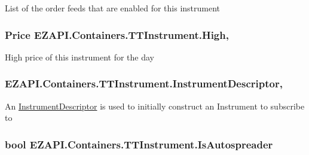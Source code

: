List of the order feeds that are enabled for this instrument 

\hypertarget{class_e_z_a_p_i_1_1_containers_1_1_t_t_instrument_aec69a584ec4a677757a51f664ccf5a7f}{
\subsubsection[{High}]{\setlength{\rightskip}{0pt plus 5cm}Price E\-Z\-A\-P\-I.\-Containers.\-T\-T\-Instrument.\-High\hspace{0.3cm}{\ttfamily [get]}, {\ttfamily [set]}}}\label{class_e_z_a_p_i_1_1_containers_1_1_t_t_instrument_aec69a584ec4a677757a51f664ccf5a7f}


High price of this instrument for the day 

\hypertarget{class_e_z_a_p_i_1_1_containers_1_1_t_t_instrument_ae2974cc8462657c2232b5bf1b886c91d}{
\subsubsection[{Instrument\-Descriptor}]{ E\-Z\-A\-P\-I.\-Containers.\-T\-T\-Instrument.\-Instrument\-Descriptor\hspace{0.3cm}{\ttfamily [get]}, {\ttfamily [set]}}}\label{class_e_z_a_p_i_1_1_containers_1_1_t_t_instrument_ae2974cc8462657c2232b5bf1b886c91d}


An \hyperlink{class_e_z_a_p_i_1_1_containers_1_1_instrument_descriptor}{Instrument\-Descriptor} is used to initially construct an Instrument to subscribe to 

\hypertarget{class_e_z_a_p_i_1_1_containers_1_1_t_t_instrument_a150c99e13c8550c1de7d514af1a63e44}{
\subsubsection[{Is\-Autospreader}]{\setlength{\rightskip}{0pt plus 5cm}bool E\-Z\-A\-P\-I.\-Containers.\-T\-T\-Instrument.\-Is\-Autospreader\hspace{0.3cm}{\ttfamily [get]}}}\label{class_e_z_a_p_i_1_1_containers_1_1_t_t_instrument_a150c99e13c8550c1de7d514af1a63e44}



